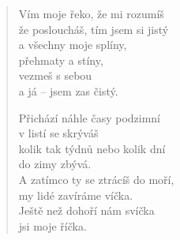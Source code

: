 \begin{multicols}{2}
\begin{verse}
Vím moje řeko, že mi rozumíš\\
že posloucháš, tím jsem si jistý\\
a všechny moje splíny,\\
přehmaty a stíny,\\
vezmeš s sebou\\
a já – jsem zas čistý.
 
Přichází náhle časy podzimní\\
v listí se skrýváš\\
kolik tak týdnů nebo kolik dní\\
do zimy zbývá.\\
A zatímco ty se ztrácíš do moří,\\
my lidé zavíráme víčka.\\
Ještě než dohoří nám svíčka\\
jsi moje říčka.
\end{verse}

\end{multicols}
